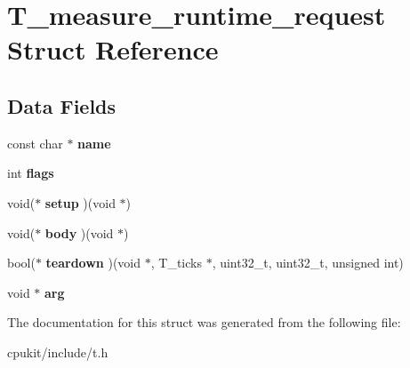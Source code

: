 \hypertarget{structT__measure__runtime__request}{}\section{T\+\_\+measure\+\_\+runtime\+\_\+request Struct Reference}
\label{structT__measure__runtime__request}
\subsection*{Data Fields}
\begin{DoxyCompactItemize}
\item 
\mbox{\label{structT__measure__runtime__request_aade7db22c9b6f559030181e63d274546}} 
const char $\ast$ {\bfseries name}
\item 
\mbox{\label{structT__measure__runtime__request_abf79afe63fc3441e9e6fbfdd43892302}} 
int {\bfseries flags}
\item 
\mbox{\label{structT__measure__runtime__request_ad4a150b6259b62b6616cd0798b7a1e36}} 
void($\ast$ {\bfseries setup} )(void $\ast$)
\item 
\mbox{\label{structT__measure__runtime__request_a0783eddeed706c133827355e01d89922}} 
void($\ast$ {\bfseries body} )(void $\ast$)
\item 
\mbox{\label{structT__measure__runtime__request_a6049c3e1b286de723c2cf7c98772501a}} 
bool($\ast$ {\bfseries teardown} )(void $\ast$, T\+\_\+ticks $\ast$, uint32\+\_\+t, uint32\+\_\+t, unsigned int)
\item 
\mbox{\label{structT__measure__runtime__request_ab16ea8113a1762e979dbddc0e27435a8}} 
void $\ast$ {\bfseries arg}
\end{DoxyCompactItemize}


The documentation for this struct was generated from the following file\+:\begin{DoxyCompactItemize}
\item 
cpukit/include/t.\+h\end{DoxyCompactItemize}

